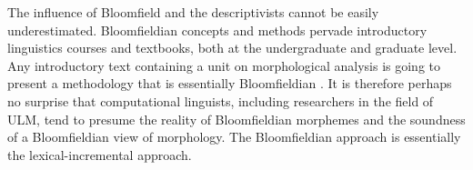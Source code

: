 The influence of Bloomfield and the descriptivists %
cannot be easily underestimated. Bloomfieldian concepts and methods 
pervade introductory linguistics courses and textbooks, both at
the undergraduate and graduate level. Any introductory text containing 
a unit on morphological analysis is going to present a methodology that 
is essentially Bloomfieldian \citep{anderson:2017}.
It is therefore perhaps no surprise that
computational linguists, including researchers in the field of \ac{ULM}, 
tend to presume %
the reality of Bloomfieldian morphemes and the soundness of a 
Bloomfieldian view of morphology. The Bloomfieldian approach is essentially
the lexical-incremental approach.

